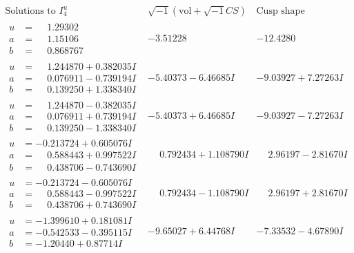 \documentclass[1p]{elsarticle_modified}
\theoremstyle{definition}
\newcommand{\I}{\sqrt{-1}}
\begin{document}
$$\begin{array}{c|c|c}  
\text{Solutions to }I^u_{4}& \I (\text{vol} + \sqrt{-1}CS) & \text{Cusp shape}\\
 \hline 
\begin{aligned}
u &= \phantom{-}1.29302\phantom{ +0.000000I} \\
a &= \phantom{-}1.15106\phantom{ +0.000000I} \\
b &= \phantom{-}0.868767\phantom{ +0.000000I}\end{aligned}
 & -3.51228\phantom{ +0.000000I} & -12.4280\phantom{ +0.000000I} \\ \hline\begin{aligned}
u &= \phantom{-}1.244870 + 0.382035 I \\
a &= \phantom{-}0.076911 - 0.739194 I \\
b &= \phantom{-}0.139250 + 1.338340 I\end{aligned}
 & -5.40373 - 6.46685 I & -9.03927 + 7.27263 I \\ \hline\begin{aligned}
u &= \phantom{-}1.244870 - 0.382035 I \\
a &= \phantom{-}0.076911 + 0.739194 I \\
b &= \phantom{-}0.139250 - 1.338340 I\end{aligned}
 & -5.40373 + 6.46685 I & -9.03927 - 7.27263 I \\ \hline\begin{aligned}
u &= -0.213724 + 0.605076 I \\
a &= \phantom{-}0.588443 + 0.997522 I \\
b &= \phantom{-}0.438706 - 0.743690 I\end{aligned}
 & \phantom{-}0.792434 + 1.108790 I & \phantom{-}2.96197 - 2.81670 I \\ \hline\begin{aligned}
u &= -0.213724 - 0.605076 I \\
a &= \phantom{-}0.588443 - 0.997522 I \\
b &= \phantom{-}0.438706 + 0.743690 I\end{aligned}
 & \phantom{-}0.792434 - 1.108790 I & \phantom{-}2.96197 + 2.81670 I \\ \hline\begin{aligned}
u &= -1.399610 + 0.181081 I \\
a &= -0.542533 - 0.395115 I \\
b &= -1.20440 + 0.87714 I\end{aligned}
 & -9.65027 + 6.44768 I & -7.33532 - 4.67890 I \\ \hline\begin{aligned}

\end{aligned}
\end{array}$$
\end{document}
